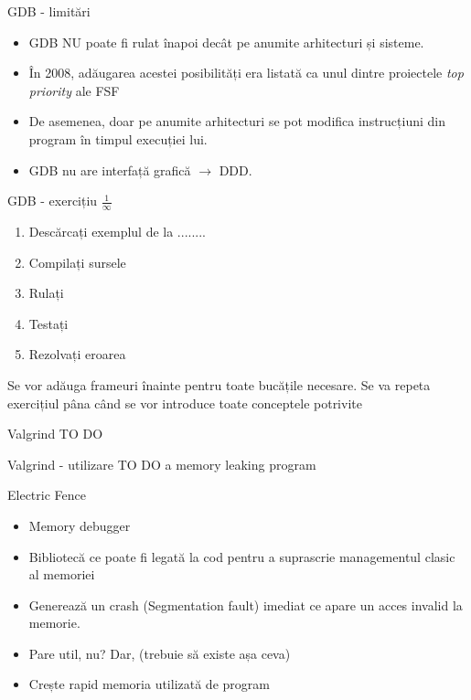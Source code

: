 \documentclass{beamer}
\begin{document}
\begin{frame}{GDB - limitări}
\begin{itemize}
\item GDB NU poate fi rulat înapoi \pause decât pe anumite arhitecturi și sisteme.
\item \pause În 2008, adăugarea acestei posibilități era listată ca unul dintre proiectele \textit{top priority} ale FSF
\item \pause De asemenea, doar pe anumite arhitecturi se pot modifica instrucțiuni din program în timpul execuției lui.
\item \pause GDB nu are interfață grafică $\rightarrow$ DDD.
\end{itemize}
\end{frame}

\begin{frame}{GDB - exercițiu $\frac{1}{\infty}$}
\begin{enumerate}
\item Descărcați exemplul de la ........
\item Compilați sursele
\item Rulați
\item Testați
\item Rezolvați eroarea
\end{enumerate}
Se vor adăuga frameuri înainte pentru toate bucățile necesare. Se va repeta exercițiul pâna când se vor introduce toate conceptele potrivite
\end{frame}

\begin{frame}{Valgrind}
TO DO
\end{frame}

\begin{frame}{Valgrind - utilizare}
TO DO a memory leaking program
\end{frame}

\begin{frame}{Electric Fence}
\begin{itemize}
\item Memory debugger
\item Bibliotecă ce poate fi legată la cod pentru a suprascrie managementul clasic al memoriei
\item Generează un crash (Segmentation fault) imediat ce apare un acces invalid la memorie.
\item \pause Pare util, nu? \pause Dar, (trebuie să existe așa ceva)
\item \pause Crește rapid memoria utilizată de program
\end{itemize}
\end{frame}
\end{document}
